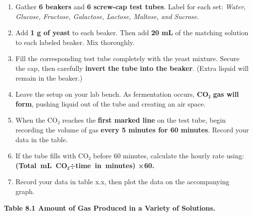 \documentclass[
  letterpaper,
  DIV=11,
  numbers=noendperiod]{scrreprt}
\begin{document}
\begin{enumerate}
\def\labelenumi{\arabic{enumi}.}
\item
  Gather \textbf{6 beakers} and \textbf{6 screw-cap test tubes}. Label
  for each set: \emph{Water, Glucose, Fructose, Galactose, Lactose,
  Maltose, and} \emph{Sucrose}.
\item
  Add \textbf{1 g of yeast} to each beaker. Then add \textbf{20 mL} of
  the matching solution to each labeled beaker. Mix thoroughly.
\item
  Fill the corresponding test tube completely with the yeast mixture.
  Secure the cap, then carefully \textbf{invert the tube into the
  beaker}. (Extra liquid will remain in the beaker.)
\item
  Leave the setup on your lab bench. As fermentation occurs, \textbf{CO₂
  gas will form}, pushing liquid out of the tube and creating an air
  space.
\item
  When the CO₂ reaches the \textbf{first marked line} on the test tube,
  begin recording the volume of gas \textbf{every 5 minutes for 60
  minutes}. Record your data in the table.
\item
  If the tube fills with CO₂ before 60 minutes, calculate the hourly
  rate using: \textbf{(Total~mL~CO₂÷time~in~minutes) ×60.}
\item
  Record your data in table x.x, then plot the data on the accompanying
  graph.
\end{enumerate}

\textbf{Table 8.1 Amount of Gas Produced in a Variety of Solutions.}
\end{document}
